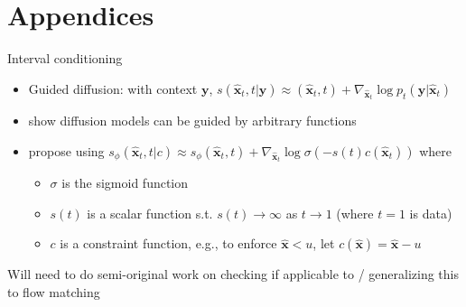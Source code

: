 \documentclass[handout, aspectratio=169,xcolor=dvipsnames]{beamer}
\begin{document}
\section{Appendices}
\begin{frame}{Interval conditioning}
    \begin{itemize}
        \item Guided diffusion: with context $\mathbf{y}$, $s(\mathbf{\hat{x}}_t, t | \mathbf{y}) \approx (\mathbf{\hat{x}}_t, t) + \nabla_{\mathbf{\hat{x}}_t} \log p_t (\mathbf{y} | \mathbf{\hat{x}}_t)$
        \item \cite{bansalUniversalGuidanceDiffusion2023} show diffusion models can be guided by arbitrary functions
        \item \cite{gloecklerAllinoneSimulationbasedInference2024} propose using $s_\phi(\mathbf{\hat{x}}_t, t | c) \approx s_\phi(\mathbf{\hat{x}}_t, t) + \nabla_{\mathbf{\hat{x}}_t} \log \sigma(-s(t) c(\mathbf{\hat{x}}_t))$ where \begin{itemize}
            \item $\sigma$ is the sigmoid function
            \item $s(t)$ is a scalar function s.t. $s(t) \to \infty$ as $t \to 1$ (where $t = 1$ is data)
            \item $c$ is a constraint function, e.g., to enforce $\mathbf{\hat{x}} < u$, let $c(\mathbf{\hat{x}}) = \mathbf{\hat{x}} - u$
        \end{itemize}
    \end{itemize}
    Will need to do semi-original work on checking if applicable to / generalizing this to flow matching
\end{frame}
\end{document}
